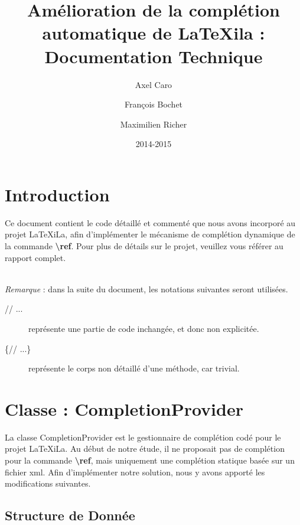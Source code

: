 \documentclass[a4paper,11pt]{report}
\title{Amélioration de la complétion automatique de \LaTeX{}ila : Documentation Technique}
\author{Axel Caro\and François Bochet\and Maximilien Richer}
\date{2014-2015}
\begin{document}


\maketitle %
\tableofcontents %

\chapter{Introduction}
\label{cha:Introduction}
Ce document contient le code détaillé et commenté que nous avons incorporé au projet LaTeXiLa, afin d'implémenter le mécanisme de complétion dynamique de la commande \textbf{\textbackslash{}ref}.
Pour plus de détails sur le projet, veuillez vous référer au rapport complet.

\\\textit{Remarque} : dans la suite du document, les notations suivantes seront utilisées.

\begin{description}
  \item[// ...] représente une partie de code inchangée, et donc non explicitée.
  \item[\{// ...\}] représente le corps non détaillé d'une méthode, car trivial.
\end{description}

\chapter{Classe : CompletionProvider}
\label{cha:classe_completionProvider}
La classe CompletionProvider est le gestionnaire de complétion codé pour le projet LaTeXiLa.
Au début de notre étude, il ne proposait pas de complétion pour la commande \textbf{\textbackslash{}ref}, mais uniquement une complétion statique basée sur un fichier xml.
Afin d'implémenter notre solution, nous y avons apporté les modifications suivantes.

\section{Structure de Donnée}
\label{sec:CP_structure_de_données}
\end{document}
